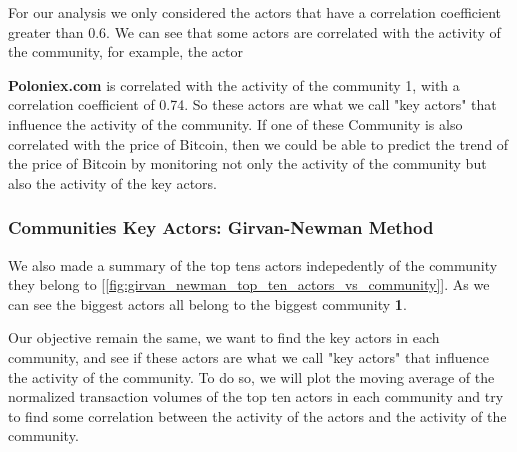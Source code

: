 \documentclass[a4paper, 12pt]{article}
\begin{document}
\begin{table}[!htb]
    \begin{minipage}{0.5\linewidth}
        \centering
        \caption{Correlation Between Moving Average of Normalized Transaction Volumes}
        \label{tab:louvain_correlation_matrix}
    \end{minipage}%
    \hspace{0.05\linewidth} %
    \begin{minipage}{0.45\linewidth}
        For our analysis we only considered the actors that have a correlation coefficient greater than 0.6.
        We can see that some actors are correlated with the activity of the community, for example, the actor
    \end{minipage}
\end{table}
\textbf{Poloniex.com} is correlated with the activity of the community 1, with a correlation coefficient of 0.74. 
So these actors are what we call "key actors" that influence the activity of the community. If one of these Community
is also correlated with the price of Bitcoin, then we could be able to predict the trend of the price of Bitcoin by 
monitoring not only the activity of the community but also the activity of the key actors.

\subsubsection{Communities Key Actors: Girvan-Newman Method}

We also made a summary of the top tens actors indepedently of the community they belong to [\ref{fig:girvan_newman_top_ten_actors_vs_community}].
As we can see the biggest actors all belong to the biggest community \textbf{1}. 

Our objective remain the same, we want to find the key actors in each community, and see if these actors are what we call "key actors" 
that influence the activity of the community. To do so, we will plot the moving average of the normalized transaction volumes of the top ten actors in each community and try to find some correlation between the activity of the actors and the activity of the community.
\end{document}
